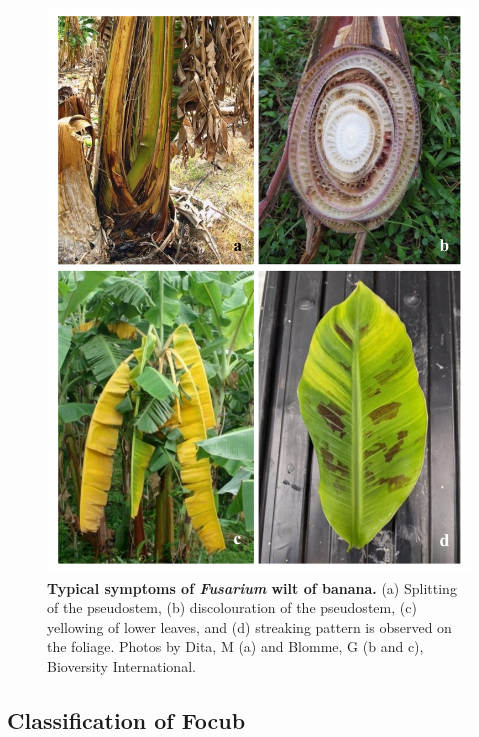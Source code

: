 \begin{figure}[pt!]
    \centering
    \includegraphics[width=15cm]{Figures/SymptomsofFoc.pdf}
    \caption[Typical symptoms of \textit{Fusarium}  wilt of banana.]{\textbf{Typical symptoms of \textit{Fusarium} wilt of banana.} (a) Splitting of the pseudostem, (b) discolouration of the pseudostem, (c) yellowing of lower leaves, and (d) streaking pattern is observed on the foliage. Photos by Dita, M (a) and Blomme, G (b and c), Bioversity International.}
    \label{fig:FusariumWiltSymptoms}
\end{figure}

\subsection{Classification of \acl{Focub}}

